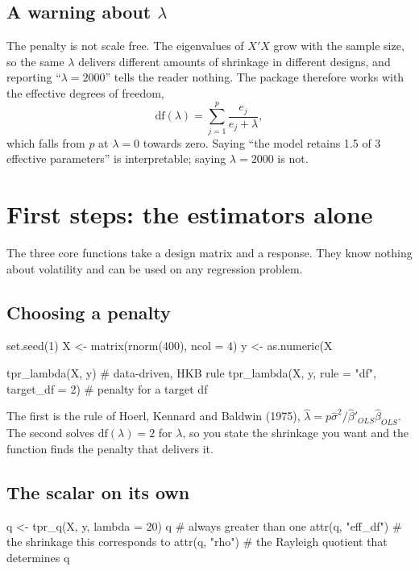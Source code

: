 \documentclass[11pt,a4paper]{report}
\begin{document}
\section{A warning about $\lambda$}

The penalty is not scale free. The eigenvalues of $X'X$ grow with the
sample size, so the same $\lambda$ delivers different amounts of
shrinkage in different designs, and reporting ``$\lambda = 2000$'' tells
the reader nothing. The package therefore works with the effective
degrees of freedom,
$$\mathrm{df}(\lambda) = \sum_{j=1}^{p} \frac{e_j}{e_j + \lambda},$$
which falls from $p$ at $\lambda = 0$ towards zero. Saying ``the model
retains 1.5 of 3 effective parameters'' is interpretable; saying
$\lambda = 2000$ is not.

\chapter{First steps: the estimators alone}

The three core functions take a design matrix and a response. They know
nothing about volatility and can be used on any regression problem.

\section{Choosing a penalty}

\begin{Rblock}
set.seed(1)
X <- matrix(rnorm(400), ncol = 4)
y <- as.numeric(X %

tpr_lambda(X, y)                                # data-driven, HKB rule
tpr_lambda(X, y, rule = "df", target_df = 2)    # penalty for a target df
\end{Rblock}

The first is the rule of Hoerl, Kennard and Baldwin (1975),
$\hat\lambda = p\hat\sigma^2 / \hat\beta'_{OLS}\hat\beta_{OLS}$. The
second solves $\mathrm{df}(\lambda) = 2$ for $\lambda$, so you state the
shrinkage you want and the function finds the penalty that delivers it.

\section{The scalar on its own}

\begin{Rblock}
q <- tpr_q(X, y, lambda = 20)
q                       # always greater than one
attr(q, "eff_df")       # the shrinkage this corresponds to
attr(q, "rho")          # the Rayleigh quotient that determines q
\end{Rblock}
\end{document}
